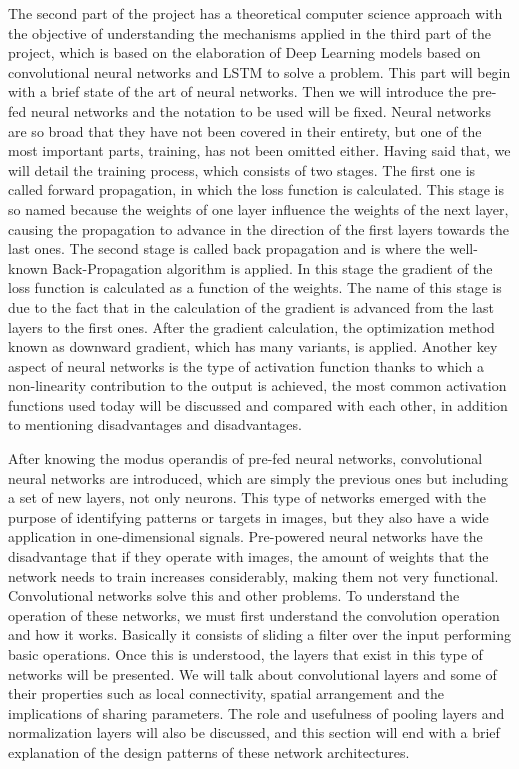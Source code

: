     
    
    The second part of the project has a theoretical computer science approach with the objective of understanding the mechanisms applied in the third part of the project, which is based on the elaboration of Deep Learning models based on convolutional neural networks and LSTM to solve a problem. This part will begin with a brief state of the art of neural networks. Then we will introduce the pre-fed neural networks and the notation to be used will be fixed. Neural networks are so broad that they have not been covered in their entirety, but one of the most important parts, training, has not been omitted either. Having said that, we will detail the training process, which consists of two stages. The first one is called forward propagation, in which the loss function is calculated. This stage is so named because the weights of one layer influence the weights of the next layer, causing the propagation to advance in the direction of the first layers towards the last ones. The second stage is called back propagation and is where the well-known Back-Propagation algorithm is applied. In this stage the gradient of the loss function is calculated as a function of the weights. The name of this stage is due to the fact that in the calculation of the gradient is advanced from the last layers to the first ones. After the gradient calculation, the optimization method known as downward gradient, which has many variants, is applied. Another key aspect of neural networks is the type of activation function thanks to which a non-linearity contribution to the output is achieved, the most common activation functions used today will be discussed and compared with each other, in addition to mentioning disadvantages and disadvantages.
    
    
    After knowing the modus operandis of pre-fed neural networks, convolutional neural networks are introduced, which are simply the previous ones but including a set of new layers, not only neurons. This type of networks emerged with the purpose of identifying patterns or targets in images, but they also have a wide application in one-dimensional signals. Pre-powered neural networks have the disadvantage that if they operate with images, the amount of weights that the network needs to train increases considerably, making them not very functional. Convolutional networks solve this and other problems. To understand the operation of these networks, we must first understand the convolution operation and how it works. Basically it consists of sliding a filter over the input performing basic operations. Once this is understood, the layers that exist in this type of networks will be presented. We will talk about convolutional layers and some of their properties such as local connectivity, spatial arrangement and the implications of sharing parameters. The role and usefulness of pooling layers and normalization layers will also be discussed, and this section will end with a brief explanation of the design patterns of these network architectures. \\
    
